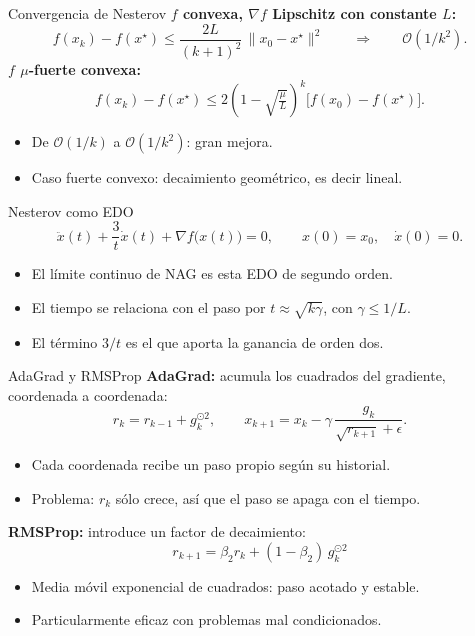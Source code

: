 \documentclass[10pt,aspectratio=169]{beamer}
\begin{document}
\begin{frame}{Convergencia de Nesterov}
  \small
  \textbf{$f$ convexa, $\nabla f$ Lipschitz con constante $L$:}
  \[
    f(x_k)-f(x^\star)\le\frac{2L}{(k+1)^2}\,\|x_0-x^\star\|^2
    \qquad\Longrightarrow\qquad \mathcal{O}(1/k^{2}).
  \]
  \textbf{$f$ $\mu$-fuerte convexa:}
  \[
    f(x_k)-f(x^\star)\le
      2\left(1-\sqrt{\tfrac{\mu}{L}}\right)^{k}
      \big[f(x_0)-f(x^\star)\big].
  \]
  \begin{itemize}
    \item De $\mathcal{O}(1/k)$ a $\mathcal{O}(1/k^{2})$: gran mejora.
    \item Caso fuerte convexo: decaimiento geométrico, es decir lineal.
  \end{itemize}
\end{frame}

\begin{frame}{Nesterov como EDO}
  \small
  \[
    \ddot x(t)+\frac{3}{t}\dot x(t)+\nabla f\big(x(t)\big)=0,
  \qquad x(0)=x_0,\quad \dot x(0)=0.
  \]
  \begin{itemize}
    \item El límite continuo de NAG es esta EDO de segundo orden.
    \item El tiempo se relaciona con el paso por $t\approx\sqrt{k\gamma}$,
      con $\gamma\le 1/L$.
    \item El término $3/t$ es el que aporta la ganancia de orden dos.
  \end{itemize}
\end{frame}

\begin{frame}{AdaGrad y RMSProp}
  \small
  \textbf{AdaGrad:} acumula los cuadrados del gradiente, coordenada a coordenada:
  \[
    r_k=r_{k-1}+g_k^{\odot 2},
    \qquad
    x_{k+1}=x_k-\gamma\,\frac{g_k}{\sqrt{r_{k+1}}+\epsilon}.
  \]
  \begin{itemize}
    \item Cada coordenada recibe un paso propio según su historial.
    \item Problema: $r_k$ sólo crece, así que el paso se apaga con el tiempo.
  \end{itemize}
  \textbf{RMSProp:} introduce un factor de decaimiento:
  \[
    \boxed{\;r_{k+1}=\beta_2 r_k+(1-\beta_2)\,g_k^{\odot 2}\;}
  \]
  \begin{itemize}
    \item Media móvil exponencial de cuadrados: paso acotado y estable.
    \item Particularmente eficaz con problemas mal condicionados.
  \end{itemize}
\end{frame}
\end{document}
